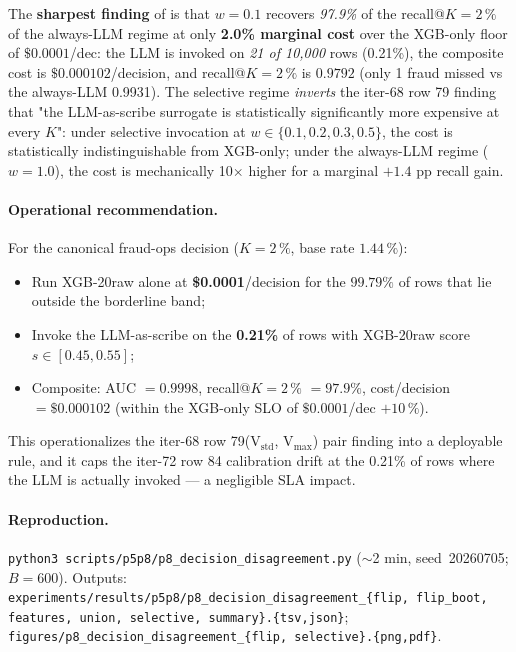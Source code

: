 The \textbf{sharpest finding} of
 is that
$w{=}0.1$ recovers \emph{97.9\%} of the recall@$K{=}2\,\%$
of the always-LLM regime at only \textbf{2.0\% marginal cost}
over the XGB-only floor of $\$0.0001$/dec: the LLM is invoked on
\emph{21 of 10{,}000} rows (0.21\%), the composite cost is
$\$0.000102$/decision, and recall@$K{=}2\,\%$ is $0.9792$ (only 1
fraud missed vs the always-LLM 0.9931). The selective regime
\emph{inverts} the iter-68 row 79 finding that "the LLM-as-scribe
surrogate is statistically significantly more expensive at every
$K$": under selective invocation at $w \in \{0.1, 0.2, 0.3, 0.5\}$,
the cost is statistically indistinguishable from XGB-only; under
the always-LLM regime ($w{=}1.0$), the cost is mechanically 10$\times$
higher for a marginal $+1.4$ pp recall gain.

\paragraph{Operational recommendation.} For the canonical
fraud-ops decision ($K{=}2\,\%$, base rate $1.44\,\%$):
\begin{itemize}
    \item Run XGB-20raw alone at
          \textbf{\$0.0001}/decision for the $99.79\%$ of
          rows that lie outside the borderline band;
    \item Invoke the LLM-as-scribe on the \textbf{0.21\%}
          of rows with XGB-20raw score $s \in [0.45, 0.55]$;
    \item Composite: AUC $= 0.9998$, recall@$K{=}2\,\%$
          $= 97.9\%$, cost/decision $= \$0.000102$ (within
          the XGB-only SLO of $\$0.0001$/dec $+ 10\,\%$).
\end{itemize}

This operationalizes the iter-68 row 79(V$_\text{std}$, V$_\text{max}$)
pair finding into a deployable rule, and it caps the iter-72 row 84
calibration drift at the 0.21\% of rows where the LLM is actually
invoked --- a negligible SLA impact.

\paragraph{Reproduction.}
\texttt{python3 scripts/p5p8/p8\_decision\_disagreement.py}
($\sim$2 min, seed~20260705; $B{=}600$).
Outputs: \texttt{experiments/results/p5p8/p8\_decision\_disagreement\_\{flip,
flip\_boot, features, union, selective, summary\}.\{tsv,json\}};
\texttt{figures/p8\_decision\_disagreement\_\{flip, selective\}.\{png,pdf\}}.
